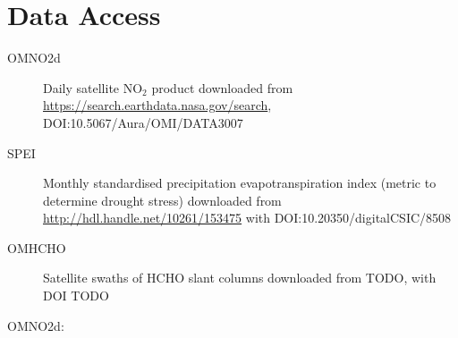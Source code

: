 \section{Data Access}
  \label{LR:DataAccess}
  \begin{description}
    \item[OMNO2d] Daily satellite NO$_2$ product downloaded from \url{https://search.earthdata.nasa.gov/search}, DOI:10.5067/Aura/OMI/DATA3007
    \item[SPEI] Monthly standardised precipitation evapotranspiration index (metric to determine drought stress) downloaded from \url{http://hdl.handle.net/10261/153475} with DOI:10.20350/digitalCSIC/8508
    \item[OMHCHO] Satellite swaths of HCHO slant columns downloaded from TODO, with DOI TODO
  \end{description}
  OMNO2d: